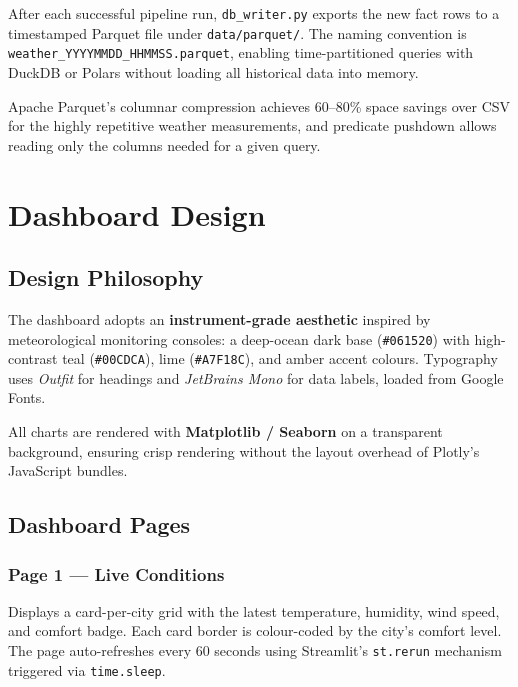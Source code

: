 \documentclass[12pt,a4paper]{report}
\begin{document}
After each successful pipeline run, \texttt{db\_writer.py} exports the new fact rows to a timestamped Parquet file under \texttt{data/parquet/}. The naming convention is \texttt{weather\_YYYYMMDD\_HHMMSS.parquet}, enabling time-partitioned queries with DuckDB or Polars without loading all historical data into memory.

Apache Parquet's columnar compression achieves 60--80\% space savings over CSV for the highly repetitive weather measurements, and predicate pushdown allows reading only the columns needed for a given query.

\chapter{Dashboard Design}

\section{Design Philosophy}

The dashboard adopts an \textbf{instrument-grade aesthetic} inspired by meteorological monitoring consoles: a deep-ocean dark base (\texttt{\#061520}) with high-contrast teal (\texttt{\#00CDCA}), lime (\texttt{\#A7F18C}), and amber accent colours. Typography uses \textit{Outfit} for headings and \textit{JetBrains Mono} for data labels, loaded from Google Fonts.

All charts are rendered with \textbf{Matplotlib / Seaborn} on a transparent background, ensuring crisp rendering without the layout overhead of Plotly's JavaScript bundles.

\section{Dashboard Pages}

\subsection{Page 1 — Live Conditions}

Displays a card-per-city grid with the latest temperature, humidity, wind speed, and comfort badge. Each card border is colour-coded by the city's comfort level. The page auto-refreshes every 60 seconds using Streamlit's \texttt{st.rerun} mechanism triggered via \texttt{time.sleep}.
\end{document}

